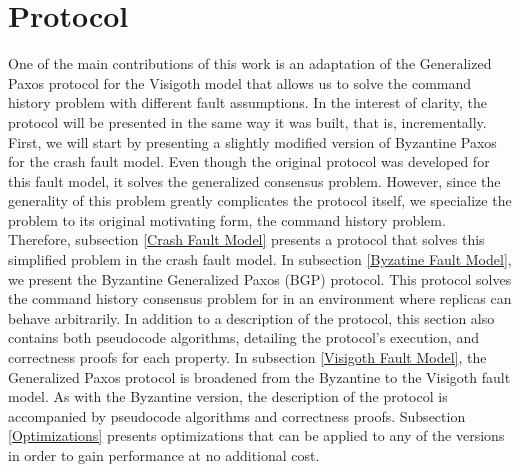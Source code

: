 \chapter{Protocol}

One of the  main contributions of this work is an adaptation of the Generalized Paxos protocol for the Visigoth model that allows us to solve the command history problem with different fault assumptions. In the interest of clarity, the protocol will be presented in the same way it was built, that is, incrementally. First, we will start by presenting a slightly modified version of Byzantine Paxos for the crash fault model. Even though the original protocol was developed for this fault model, it solves the generalized consensus problem. However, since the generality of this problem greatly complicates the protocol itself, we specialize the problem to its original motivating form, the command history problem. Therefore, subsection \ref{Crash Fault Model} presents a protocol that solves this simplified problem in the crash fault model. In subsection \ref{Byzatine Fault Model}, we present the Byzantine Generalized Paxos (BGP) protocol. This protocol solves the command history consensus problem for in an environment where replicas can behave arbitrarily. In addition to a description of the protocol, this section also contains both pseudocode algorithms, detailing the protocol's execution, and correctness proofs for each property. In subsection \ref{Visigoth Fault Model}, the Generalized Paxos protocol is broadened from the Byzantine to the Visigoth fault model. As with the Byzantine version, the description of the protocol is accompanied by pseudocode algorithms and correctness proofs. Subsection \ref{Optimizations} presents optimizations that can be applied to any of the versions in order to gain performance at no additional cost.



\clearpage


\clearpage


\clearpage


%
